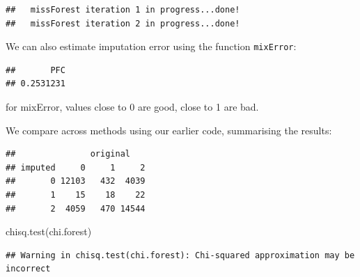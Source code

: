 \documentclass[
]{book}
\newenvironment{Shaded}{\begin{snugshade}}{\end{snugshade}}
\newcommand{\AttributeTok}[1]{\textcolor[rgb]{0.77,0.63,0.00}{#1}}
\newcommand{\FloatTok}[1]{\textcolor[rgb]{0.00,0.00,0.81}{#1}}
\newcommand{\FunctionTok}[1]{\textcolor[rgb]{0.00,0.00,0.00}{#1}}
\newcommand{\NormalTok}[1]{#1}
\newcommand{\OtherTok}[1]{\textcolor[rgb]{0.56,0.35,0.01}{#1}}
\newcommand{\SpecialCharTok}[1]{\textcolor[rgb]{0.00,0.00,0.00}{#1}}
\newcommand{\StringTok}[1]{\textcolor[rgb]{0.31,0.60,0.02}{#1}}
\begin{document}
\begin{verbatim}
##   missForest iteration 1 in progress...done!
##   missForest iteration 2 in progress...done!
\end{verbatim}

We can also estimate imputation error using the function \texttt{mixError}:

\begin{Shaded}
\end{Shaded}

\begin{verbatim}
##       PFC 
## 0.2531231
\end{verbatim}

for mixError, values close to 0 are good, close to 1 are bad.

We compare across methods using our earlier code, summarising the results:

\begin{Shaded}
\end{Shaded}

\begin{verbatim}
##               original
## imputed     0     1     2
##       0 12103   432  4039
##       1    15    18    22
##       2  4059   470 14544
\end{verbatim}

\begin{Shaded}
\begin{Highlighting}[]
\FunctionTok{chisq.test}\NormalTok{(chi.forest) }
\end{Highlighting}
\end{Shaded}

\begin{verbatim}
## Warning in chisq.test(chi.forest): Chi-squared approximation may be incorrect
\end{verbatim}
\end{document}
